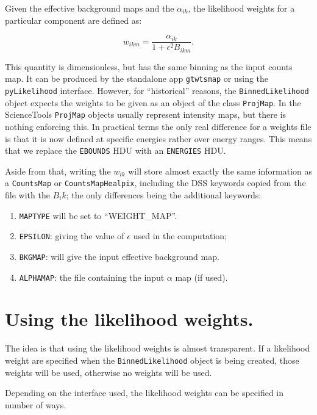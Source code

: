 \documentclass[preprint]{aastex}
\begin{document}
Given the effective background maps and the $\alpha_{ik}$, the
likelihood weights for a particular component are defined as:

\begin{equation}
w_{ikm} = \frac{\alpha_{ik}}{1 + \epsilon^2 B_{ikm}}.
\end{equation}

This quantity is dimensionless, but has the same binning as the input
counts map.  It can be produced by the standalone app {\tt gtwtsmap}
or using the {\tt pyLikelihood} interface.  However, for ``historical'' 
reasons, the {\tt BinnedLikelihood} object expects the weights to 
be given as an object of the class {\tt ProjMap}.  In the ScienceTools 
{\tt ProjMap} objects usually represent intensity maps, but there is 
nothing enforcing this.  In practical terms the only real difference 
for a weights file is that it is now defined at specific energies
rather over energy ranges.  This means that we replace the {\tt EBOUNDS}
HDU with an {\tt ENERGIES} HDU.

Aside from that, writing the $w_{ik}$ will store almost exactly the
same information as a {\tt CountsMap} or {\tt CountsMapHealpix},
including the DSS keywords copied from the file with the $B_ik$; the
only differences being the additional keywords:

\begin{enumerate}
\item{{\tt MAPTYPE} will be set to ``WEIGHT\_MAP''.}
\item{{\tt EPSILON}: giving the value of $\epsilon$ used in the computation;}
\item{{\tt BKGMAP}: will give the input effective background map.}    
\item{{\tt ALPHAMAP}: the file containing the input $\alpha$ map (if used).}
\end{enumerate}


\section{Using the likelihood weights.}

The idea is that using the likelihood weights is almost transparent.
If a likelihood weight are specified when the {\tt BinnedLikelihood}
object is being created, those weights will be used, otherwise no
weights will be used.

Depending on the interface used, the likelihood weights can be
specified in number of ways.
\end{document}
